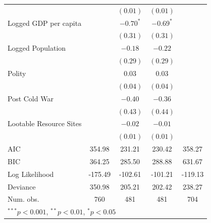 \documentclass[12pt,]{book}
\let\origtable\table
\let\endorigtable\endtable
\renewenvironment{table}[1][2] {
    \singlespacing
    \expandafter\origtable\expandafter[H]
} {
    \endorigtable
}
\theoremstyle{definition}
\theoremstyle{definition}
\theoremstyle{definition}
\theoremstyle{remark}
\begin{document}
\begin{table}
\begin{center}
\begin{tabular}{l c c c c }
                                  &               & $(0.01)$     & $(0.01)$    &              \\
Logged GDP per capita             &               & $-0.70^{*}$  & $-0.69^{*}$ &              \\
                                  &               & $(0.31)$     & $(0.31)$    &              \\
Logged Population                 &               & $-0.18$      & $-0.22$     &              \\
                                  &               & $(0.29)$     & $(0.29)$    &              \\
Polity                            &               & $0.03$       & $0.03$      &              \\
                                  &               & $(0.04)$     & $(0.04)$    &              \\
Post Cold War                     &               & $-0.40$      & $-0.36$     &              \\
                                  &               & $(0.43)$     & $(0.44)$    &              \\
Lootable Resource Sites           &               & $-0.02$      & $-0.01$     &              \\
                                  &               & $(0.01)$     & $(0.01)$    &              \\
\hline
AIC                               & 354.98        & 231.21       & 230.42      & 358.27       \\
BIC                               & 364.25        & 285.50       & 288.88      & 631.67       \\
Log Likelihood                    & -175.49       & -102.61      & -101.21     & -119.13      \\
Deviance                          & 350.98        & 205.21       & 202.42      & 238.27       \\
Num. obs.                         & 760           & 481          & 481         & 704          \\
\hline
\multicolumn{5}{l}{\scriptsize{$^{***}p<0.001$, $^{**}p<0.01$, $^*p<0.05$}}
\end{tabular}
\caption{Logit Models of Rebel Group Formation (Central Govt Conflicts Only)}
\label{tab:entry-govt}
\end{center}
\end{table}
\end{document}
